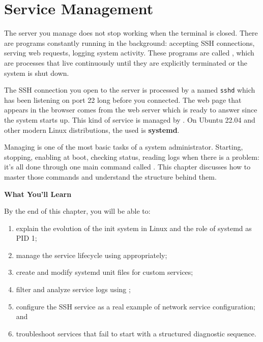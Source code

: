 
\chapter{Service Management}
\label{ch:service-management}


The server you manage does not stop working when the terminal is closed. There are programs constantly running in the background: accepting SSH connections, serving web requests, logging system activity. These programs are called , which are processes that live continuously until they are explicitly terminated or the system is shut down.

The SSH connection you open to the server is processed by a  named \texttt{sshd} which has been listening on port 22 long before you connected. The web page that appears in the browser comes from the  web server which is ready to answer since the system starts up. This kind of service is managed by . On Ubuntu 22.04 and other modern Linux distributions, the  used is \textbf{systemd}.

Managing  is one of the most basic tasks of a system administrator. Starting, stopping, enabling at boot, checking status, reading logs when there is a problem: it's all done through one main command called . This chapter discusses how to master those commands and understand the structure behind them.

\textbf{What You'll Learn}

By the end of this chapter, you will be able to:

\begin{enumerate}
\item explain the evolution of the init system in Linux and the role of systemd as PID 1;
\item manage the service lifecycle using  appropriately;
\item create and modify systemd unit files for custom services;
\item filter and analyze service logs using ;
\item configure the SSH service as a real example of network service configuration; and
\item troubleshoot services that fail to start with a structured diagnostic sequence.
\end{enumerate}

